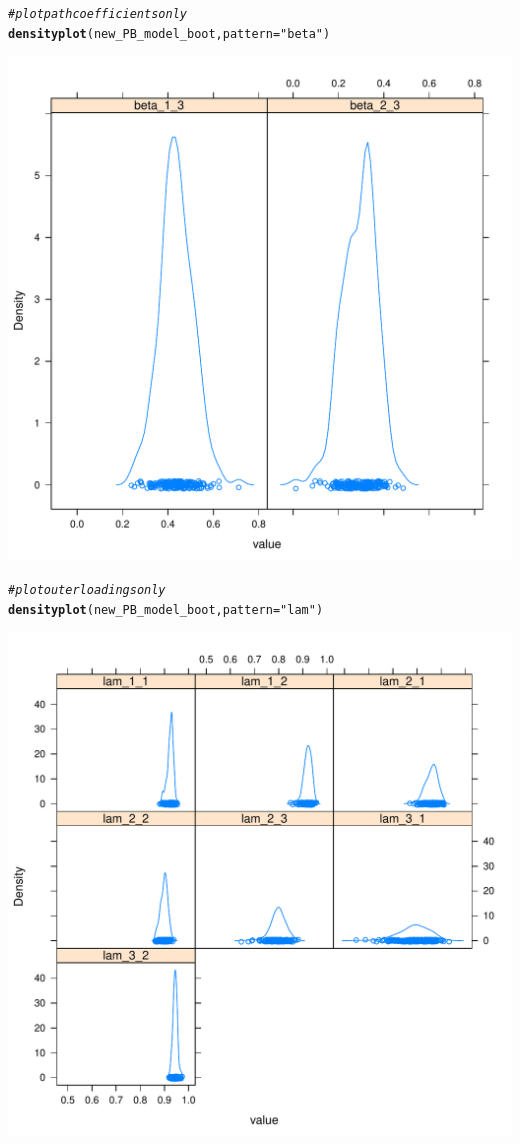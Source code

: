 \documentclass{article}\usepackage[]{graphicx}\usepackage[]{color}
\makeatletter
\def\maxwidth{ %
  \ifdim\Gin@nat@width>\linewidth
    \linewidth
  \else
    \Gin@nat@width
  \fi
}
\newcommand{\hlstr}[1]{\textcolor[rgb]{0.192,0.494,0.8}{#1}}%
\newcommand{\hlcom}[1]{\textcolor[rgb]{0.678,0.584,0.686}{\textit{#1}}}%
\newcommand{\hlstd}[1]{\textcolor[rgb]{0.345,0.345,0.345}{#1}}%
\newcommand{\hlkwc}[1]{\textcolor[rgb]{0.333,0.667,0.333}{#1}}%
\newcommand{\hlkwd}[1]{\textcolor[rgb]{0.737,0.353,0.396}{\textbf{#1}}}%
\newenvironment{kframe}{%
 \def\at@end@of@kframe{}%
 \ifinner\ifhmode%
  \def\at@end@of@kframe{\end{minipage}}%
  \begin{minipage}{\columnwidth}%
 \fi\fi%
 \def\FrameCommand##1{\hskip\@totalleftmargin \hskip-\fboxsep
 \colorbox{shadecolor}{##1}\hskip-\fboxsep
     \hskip-\linewidth \hskip-\@totalleftmargin \hskip\columnwidth}%
 \MakeFramed {\advance\hsize-\width
   \@totalleftmargin\z@ \linewidth\hsize
   \@setminipage}}%
 {\par\unskip\endMakeFramed%
 \at@end@of@kframe}
\newenvironment{knitrout}{}{} %
\makeatother
\begin{document}
\begin{knitrout}
\begin{kframe}\begin{alltt}
\hlcom{#plot path coefficients only}
\hlkwd{densityplot}\hlstd{(new_PB_model_boot,} \hlkwc{pattern}\hlstd{=}\hlstr{"beta"}\hlstd{)}
\end{alltt}
\end{kframe}
\includegraphics[width=\maxwidth]{figure/boot4} 
\begin{kframe}\begin{alltt}
\hlcom{#plot outer loadings only}
\hlkwd{densityplot}\hlstd{(new_PB_model_boot,} \hlkwc{pattern}\hlstd{=}\hlstr{"lam"}\hlstd{)}
\end{alltt}
\end{kframe}
\includegraphics[width=\maxwidth]{figure/boot5} 

\end{knitrout}
\end{document}
